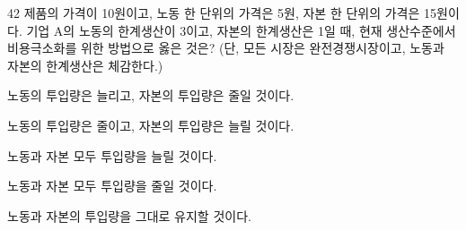 \begin{question}{42}
제품의 가격이 10원이고, 노동 한 단위의 가격은 5원, 자본 한 단위의 가격은 15원이다. 기업 A의 노동의 한계생산이 3이고, 자본의 한계생산은 1일 때, 현재 생산수준에서 비용극소화를 위한 방법으로 옳은 것은? (단, 모든 시장은 완전경쟁시장이고, 노동과 자본의 한계생산은 체감한다.)
\begin{choices}
  \item 노동의 투입량은 늘리고, 자본의 투입량은 줄일 것이다.
  \item 노동의 투입량은 줄이고, 자본의 투입량은 늘릴 것이다.
  \item 노동과 자본 모두 투입량을 늘릴 것이다.
  \item 노동과 자본 모두 투입량을 줄일 것이다.
  \item 노동과 자본의 투입량을 그대로 유지할 것이다.
\end{choices}
\end{question}
